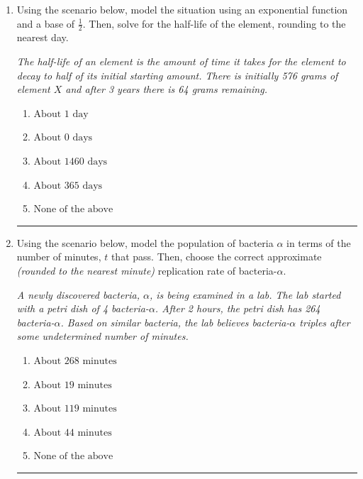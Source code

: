 \documentclass[14pt]{extbook}
\newcommand{\litem}[1]{\item#1\hspace*{-1cm}\rule{\textwidth}{0.4pt}}
\begin{document}
\begin{enumerate}
{\begin{enumerate}[label=\Alph*.]
\end{enumerate} }
\litem{
Using the scenario below, model the situation using an exponential function and a base of $\frac{1}{2}$. Then, solve for the half-life of the element, rounding to the nearest day.
\begin{center}
    \textit{ The half-life of an element is the amount of time it takes for the element to decay to half of its initial starting amount. There is initially 576 grams of element $X$ and after 3 years there is 64 grams remaining. }
\end{center}
\begin{enumerate}[label=\Alph*.]
\item \( \text{About } 1 \text{ day} \)
\item \( \text{About } 0 \text{ days} \)
\item \( \text{About } 1460 \text{ days} \)
\item \( \text{About } 365 \text{ days} \)
\item \( \text{None of the above} \)

\end{enumerate} }
\litem{
Using the scenario below, model the population of bacteria $\alpha$ in terms of the number of minutes, $t$ that pass. Then, choose the correct approximate \textit{(rounded to the nearest minute)} replication rate of bacteria-$\alpha$.
\begin{center}
    \textit{ A newly discovered bacteria, $\alpha$, is being examined in a lab. The lab started with a petri dish of 4 bacteria-$\alpha$. After 2 hours, the petri dish has 264 bacteria-$\alpha$. Based on similar bacteria, the lab believes bacteria-$\alpha$ triples after some undetermined number of minutes. }
\end{center}
\begin{enumerate}[label=\Alph*.]
\item \( \text{About } 268 \text{ minutes} \)
\item \( \text{About } 19 \text{ minutes} \)
\item \( \text{About } 119 \text{ minutes} \)
\item \( \text{About } 44 \text{ minutes} \)
\item \( \text{None of the above} \)


\end{enumerate}}
\end{enumerate}
\end{document}
